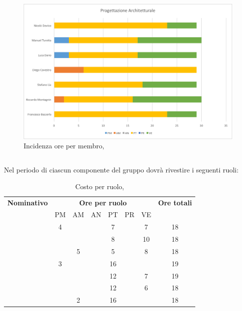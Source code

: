 \begin{figure}[H]
	\centering 
	\includegraphics[scale=0.7]{Immagini/GraficiPianoLavoro/PA.png}
	\caption{Incidenza ore per membro, \PA}
\end{figure}

\newpage
\subsection{\PD}
Nel periodo di \PD ciascun componente del gruppo dovrà rivestire i seguenti ruoli:

\begin{table}[h]
	\begin{center}
		\begin{tabular}{|c|c|c|c|c|c|c|c|}
			\hline
			\textbf{Nominativo} & \multicolumn{6}{c|}{\textbf{Ore per ruolo}} & \textbf{Ore totali} \\
					& PM & AM & AN & PT & PR & VE & \\
			\hline
			\FB		& 4  &	  &	   & 7	&	 & 7  &	18	\\
			\hline
			\RM		&	 &	  &	   & 8	&	 & 10 & 18	\\
			\hline
			\SL		&	 & 5  &	   & 5	&	 & 8  &	18	\\
			\hline
			\DC		& 3	 &	  &	   & 16	&	 & 	  &	19	\\
			\hline
			\LD 	&	 &	  &	   & 12	&	 & 7  &	19	\\
			\hline
			\MT		& 	 & 	  &	   & 12	&	 & 6  &	18	\\
			\hline
			\ND 	&	 & 2  &	   & 16	&	 &	  & 18	\\
			\hline
		\end{tabular}
	\end{center}
	\caption{Costo per ruolo, \PD}
\end{table}

